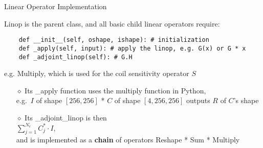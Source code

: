 \begin{frame}[fragile]{Linear Operator Implementation}

\begin{block}{Linop is the parent class, and all basic child linear operators require:}
\begin{lstlisting}
    def __init__(self, oshape, ishape): # initialization
    def _apply(self, input): # apply the linop, e.g. G(x) or G * x
    def _adjoint_linop(self): # G.H
\end{lstlisting}
\end{block}

\begin{block}{e.g. Multiply, which is used for the coil sensitivity operator $S$}
	{\large
	\begin{itemize}
		\item [$\diamond$] Its \_apply function uses the multiply function in Python, \\
				e.g.~$I$ of shape $[256,256]$ * $C$ of shape $[4,256,256]$ outputs $R$ of $C$'s shape
		\vspace{1em}
		\item [$\diamond$] Its \_adjoint\_linop is then \\
				$\sum_{j=1}^{N_c} C_j^* \cdot I$, \\
				and is implemented as a \textbf{chain} of operators Reshape * Sum * Multiply
	\end{itemize}}
\end{block}

\end{frame}


